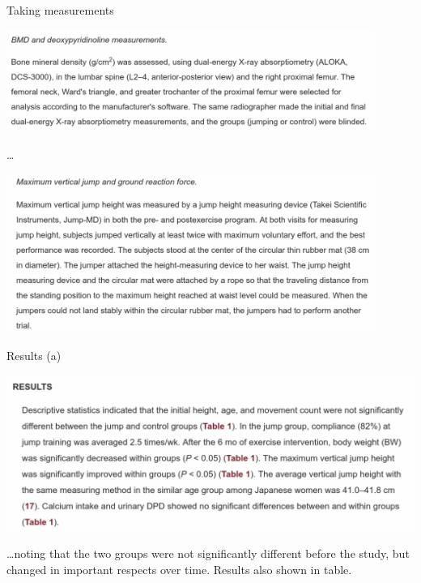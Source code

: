 \documentclass[
  ignorenonframetext,
]{beamer}
\begin{document}
\begin{frame}{Taking measurements}
\protect\hypertarget{taking-measurements}{}

\includegraphics[width=0.9\textwidth]{measurements}

\ldots{}

\includegraphics[width=0.9\textwidth]{measurementb}

\end{frame}

\begin{frame}{Results (a)}
\protect\hypertarget{results-a}{}

\includegraphics[width=\textwidth]{resultsa}

\ldots noting that the two groups were not significantly different
before the study, but changed in important respects over time. Results
also shown in table.

\end{frame}
\end{document}
